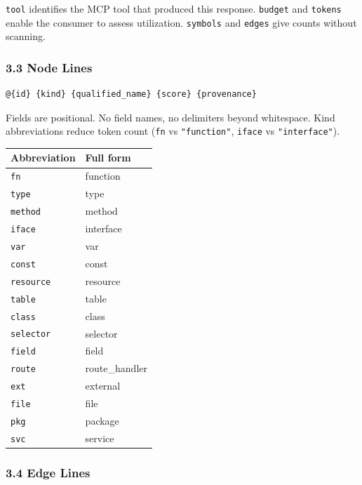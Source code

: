 \documentclass[
  11pt,
  paper=a4,
  ,captions=tableheading
]{scrartcl}
\newcounter{none} %
\begin{document}
\texttt{tool} identifies the MCP tool that produced this response.
\texttt{budget} and \texttt{tokens} enable the consumer to assess
utilization. \texttt{symbols} and \texttt{edges} give counts without
scanning.

\subsubsection{3.3 Node Lines}\label{node-lines}

\begin{verbatim}
@{id} {kind} {qualified_name} {score} {provenance}
\end{verbatim}

Fields are positional. No field names, no delimiters beyond whitespace.
Kind abbreviations reduce token count (\texttt{fn} vs
\texttt{"function"}, \texttt{iface} vs \texttt{"interface"}).

{\def\LTcaptype{none} %
\begin{longtable}[]{@{}ll@{}}
\toprule\noalign{}
Abbreviation & Full form \\
\midrule\noalign{}
\endhead
\bottomrule\noalign{}
\endlastfoot
\texttt{fn} & function \\
\texttt{type} & type \\
\texttt{method} & method \\
\texttt{iface} & interface \\
\texttt{var} & var \\
\texttt{const} & const \\
\texttt{resource} & resource \\
\texttt{table} & table \\
\texttt{class} & class \\
\texttt{selector} & selector \\
\texttt{field} & field \\
\texttt{route} & route\_handler \\
\texttt{ext} & external \\
\texttt{file} & file \\
\texttt{pkg} & package \\
\texttt{svc} & service \\
\end{longtable}
}

\subsubsection{3.4 Edge Lines}\label{edge-lines}
\end{document}
